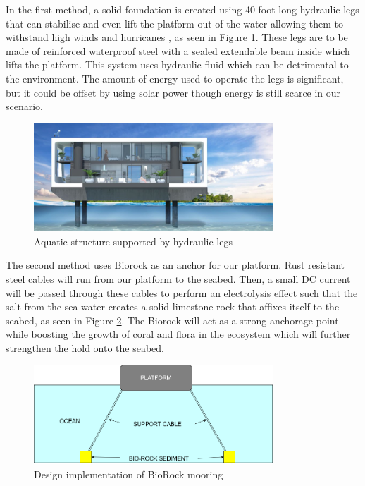 \documentclass[11pt]{article}
\numberwithin{equation}{section}
\begin{document}
In the first method, a solid foundation is created using 40-foot-long hydraulic legs that can stabilise and even lift the platform out of the water allowing them to withstand high winds and hurricanes  \cite{4s}, as seen in Figure \ref{40_foot_structure}. These legs are to be made of reinforced waterproof steel with a sealed extendable beam inside which lifts the platform. This system uses hydraulic fluid which can be detrimental to the environment. The amount of energy used to operate the legs is significant, but it could be offset by using solar power though energy is still scarce in our scenario.

\begin{figure}[H]
\centering
\includegraphics[width=0.8\textwidth]{Figures/40_foot_structure.jpg}
\caption{\label{40_foot_structure}Aquatic structure supported by hydraulic legs \cite{4s}}
\end{figure}

The second method uses Biorock as an anchor for our platform. Rust resistant steel cables will run from our platform to the seabed. Then, a small DC current will be passed through these cables to perform an electrolysis effect such that the salt from the sea water creates a solid limestone rock that affixes itself to the seabed, as seen in Figure \ref{bio_rock}. The Biorock will act as a strong anchorage point while boosting the growth of coral and flora in the ecosystem \cite{2s} which will further strengthen the hold onto the seabed.

\begin{figure}[H]
\centering
\includegraphics[width=0.8\textwidth]{Figures/bio_rock.png}
\caption{\label{bio_rock}Design implementation of BioRock mooring}
\end{figure}
\end{document}
